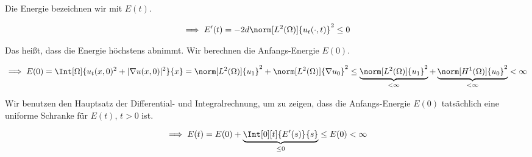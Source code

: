 \begin{solution}
\begin{enumerate}[label = (\roman*)]
    Die Energie bezeichnen wir mit $E(t)$.

    \begin{align*}
        \implies
        E^\prime(t)
        =
        -2 d \norm[L^2(\Omega)]{u_t(\cdot, t)}^2
        \leq
        0
    \end{align*}

    Das heißt, dass die Energie höchstens abnimmt.
    Wir berechnen die Anfangs-Energie $E(0)$.

    \begin{align*}
        \implies
        E(0)
        =
        \Int[\Omega]{u_t(x, 0)^2 + |\nabla u(x, 0)|^2}{x}
        =
        \norm[L^2(\Omega)]{u_1}^2 + \norm[L^2(\Omega)]{\nabla u_0}^2
        \leq
        \underbrace
        {
            \norm[L^2(\Omega)]{u_1}^2
        }_{
            < \infty
        }
        +
        \underbrace
        {
            \norm[H^1(\Omega)]{u_0}^2
        }_{
            < \infty
        }
        <
        \infty
    \end{align*}

    Wir benutzen den Hauptsatz der Differential- und Integralrechnung, um zu zeigen, dass die Anfangs-Energie $E(0)$ tatsächlich eine uniforme Schranke für $E(t)$, $t > 0$ ist.

    \begin{align*}
        \implies
        E(t)
        =
        E(0)
        +
        \underbrace
        {
            \Int[0][t]{E^\prime(s)}{s}
        }_{
            \leq 0
        }
        \leq
        E(0)
        <
        \infty
    \end{align*}
    

\end{enumerate}
\end{solution}
